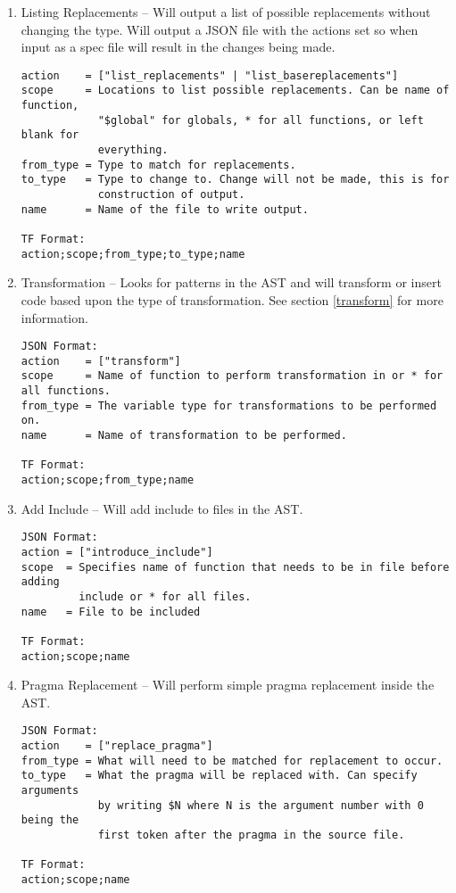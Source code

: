 \documentclass[natbib]{article}
\begin{document}
\begin{enumerate}
\item{} Listing Replacements -- Will output a list of possible replacements without 
changing the type. Will output a JSON file with the actions set so when input as a 
spec file will result in the changes being made.

\begin{verbatim}
action    = ["list_replacements" | "list_basereplacements"]
scope     = Locations to list possible replacements. Can be name of function, 
            "$global" for globals, * for all functions, or left blank for 
            everything.
from_type = Type to match for replacements.
to_type   = Type to change to. Change will not be made, this is for 
            construction of output.
name      = Name of the file to write output.

TF Format:
action;scope;from_type;to_type;name
\end{verbatim}

\item{} Transformation -- Looks for patterns in the AST and will transform or insert 
code based upon the type of transformation. See section \ref{transform} for more information.

\begin{verbatim}
JSON Format:
action    = ["transform"]
scope     = Name of function to perform transformation in or * for all functions. 
from_type = The variable type for transformations to be performed on.
name      = Name of transformation to be performed.

TF Format:
action;scope;from_type;name
\end{verbatim}

\item{} Add Include -- Will add include to files in the AST.

\begin{verbatim}
JSON Format:
action = ["introduce_include"]
scope  = Specifies name of function that needs to be in file before adding 
         include or * for all files.
name   = File to be included

TF Format:
action;scope;name
\end{verbatim}

\item{} Pragma Replacement -- Will perform simple pragma replacement inside the AST.

\begin{verbatim}
JSON Format:
action    = ["replace_pragma"]
from_type = What will need to be matched for replacement to occur.
to_type   = What the pragma will be replaced with. Can specify arguments 
            by writing $N where N is the argument number with 0 being the 
            first token after the pragma in the source file.

TF Format:
action;scope;name
\end{verbatim}
\end{enumerate}
\end{document}
